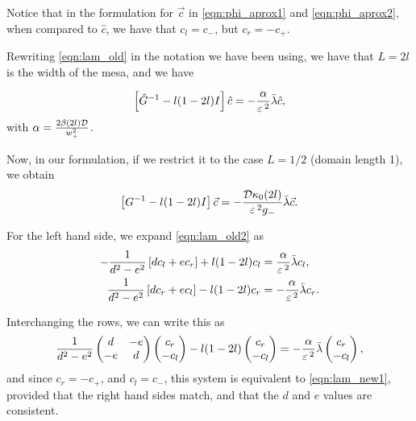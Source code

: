 \begin{remark}
Notice that in the formulation for $\vec{c}$ in \eqref{eqn:phi_aprox1} and \eqref{eqn:phi_aprox2}, when compared to $\hat{c}$, we have that $c_l=c_-$, but $c_r=-c_+$.

Rewriting \eqref{eqn:lam_old} in the notation we have been using, we have that $L=2l$ is the width of the mesa, and we have
\end{remark}
\begin{equation}
\label{eqn:lam_old2}
  \left[\hat{G}^{-1}-l(1-2l)I \right]\hat{c}=-\frac{\alpha}{\varepsilon\,^2}\bar{\lambda}\hat{c},
\end{equation}
% 
with $\alpha =\frac{2\beta(2l)\mathcal{D}}{w_+^2}$.

Now, in our formulation, if we restrict it to the case $L=1/2$ (domain length 1), we obtain
\begin{equation}
\label{eqn:lam_new1}
  \left[{G}^{-1}-l(1-2l)I \right]\vec{c}=-\frac{\mathcal{D}\kappa_0(2l)}{\varepsilon\,^2g_-}\bar{\lambda}\vec{c}.
\end{equation}
% 

For the left hand side, we expand \eqref{eqn:lam_old2} as
\begin{equation*}
\begin{split}
  -\frac{1}{d^2-e^2}\left[dc_l+ec_r \right]+l(1-2l)c_l &= \frac{\alpha}{\varepsilon\,^2}\bar{\lambda}c_l,\\
  \frac{1}{d^2-e^2}\left[dc_r+ec_l \right]-l(1-2l)c_r &= -\frac{\alpha}{\varepsilon\,^2}\bar{\lambda}c_r.
\end{split}
\end{equation*}
% 

Interchanging the rows, we can write this as
% 
\[
  \frac{1}{d^2-e^2}\begin{pmatrix} d&-e\\-e&d \end{pmatrix}\begin{pmatrix} c_r\\-c_l \end{pmatrix} -l(1-2l)\begin{pmatrix} c_r\\-c_l \end{pmatrix} = -\frac{\alpha}{\varepsilon\,^2}\bar{\lambda}\begin{pmatrix} c_r\\-c_l \end{pmatrix},
\]
% 
and since $c_r = -c_+$, and $c_l = c_-$, this system is equivalent to \eqref{eqn:lam_new1}, provided that the right hand sides match, and that the $d$ and $e$ values are consistent.

